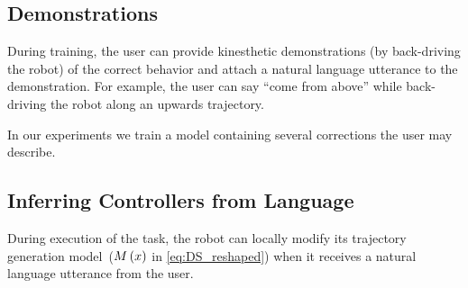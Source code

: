 \subsection{Demonstrations}

During training, the user can provide kinesthetic demonstrations (by back-driving the robot) of the correct behavior and attach a natural language utterance to the demonstration.
For example, the user can say ``come from above'' while back-driving the robot along an upwards trajectory.


In our experiments we train a model containing several corrections the user may describe.


\subsection{Inferring Controllers from Language}

During execution of the task, the robot can locally modify its trajectory generation model~($M\left( x \right)$ in \cref{eq:DS_reshaped}) when it receives a natural language utterance from the user.


